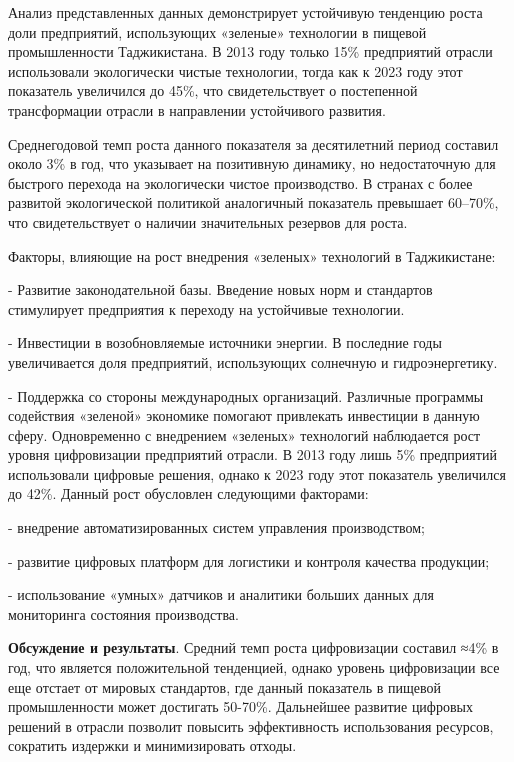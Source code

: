 \begin{multicols}{2}
Анализ представленных данных демонстрирует устойчивую тенденцию роста
доли предприятий, использующих «зеленые» технологии в пищевой
промышленности Таджикистана. В 2013 году только 15\% предприятий отрасли
использовали экологически чистые технологии, тогда как к 2023 году этот
показатель увеличился до 45\%, что свидетельствует о постепенной
трансформации отрасли в направлении устойчивого развития.

Среднегодовой темп роста данного показателя за десятилетний период
составил около 3\% в год, что указывает на позитивную динамику, но
недостаточную для быстрого перехода на экологически чистое производство.
В странах с более развитой экологической политикой аналогичный
показатель превышает 60--70\%, что свидетельствует о наличии
значительных резервов для роста.

Факторы, влияющие на рост внедрения «зеленых» технологий в Таджикистане:

- Развитие законодательной базы. Введение новых норм и стандартов
стимулирует предприятия к переходу на устойчивые технологии.

- Инвестиции в возобновляемые источники энергии. В последние годы
увеличивается доля предприятий, использующих солнечную и
гидроэнергетику.

- Поддержка со стороны международных организаций. Различные программы
содействия «зеленой» экономике помогают привлекать инвестиции в данную
сферу.
Одновременно с внедрением «зеленых» технологий наблюдается рост уровня
цифровизации предприятий отрасли. В 2013 году лишь 5\% предприятий
использовали цифровые решения, однако к 2023 году этот показатель
увеличился до 42\%. Данный рост обусловлен следующими факторами:

- внедрение автоматизированных систем управления производством;

- развитие цифровых платформ для логистики и контроля качества
продукции;

- использование «умных» датчиков и аналитики больших данных для
мониторинга состояния производства.

{\bfseries Обсуждение и результаты}. Средний темп роста цифровизации
составил ≈4\% в год, что является положительной тенденцией, однако
уровень цифровизации все еще отстает от мировых стандартов, где данный
показатель в пищевой промышленности может достигать 50-70\%. Дальнейшее
развитие цифровых решений в отрасли позволит повысить эффективность
использования ресурсов, сократить издержки и минимизировать отходы.


\end{multicols}
